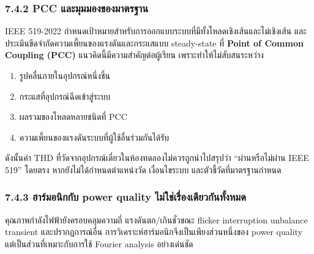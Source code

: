 \subsubsection{7.4.2 PCC และมุมมองของมาตรฐาน}

IEEE 519-2022 กำหนดเป้าหมายสำหรับการออกแบบระบบที่มีทั้งโหลดเชิงเส้นและไม่เชิงเส้น และประเมินขีดจำกัดความเพี้ยนของแรงดันและกระแสแบบ steady-state ที่ \textbf{Point of Common Coupling (PCC)} แนวคิดนี้มีความสำคัญต่อผู้เรียน เพราะทำให้ไม่สับสนระหว่าง

\begin{enumerate}
    \item รูปคลื่นภายในอุปกรณ์หนึ่งชิ้น
    \item กระแสที่อุปกรณ์ฉีดเข้าสู่ระบบ
    \item ผลรวมของโหลดหลายชนิดที่ PCC
    \item ความเพี้ยนของแรงดันระบบที่ผู้ใช้อื่นร่วมกันได้รับ
\end{enumerate}

ดังนั้นค่า THD ที่วัดจากอุปกรณ์เดี่ยวในห้องทดลองไม่ควรถูกนำไปสรุปว่า “ผ่านหรือไม่ผ่าน IEEE 519” โดยตรง หากยังไม่ได้กำหนดตำแหน่งวัด เงื่อนไขระบบ และตัวชี้วัดที่มาตรฐานกำหนด

\subsubsection{7.4.3 ฮาร์มอนิกกับ power quality ไม่ใช่เรื่องเดียวกันทั้งหมด}

คุณภาพกำลังไฟฟ้ายังครอบคลุมความถี่ แรงดันตก/เกินชั่วขณะ flicker interruption unbalance transient และปรากฏการณ์อื่น การวิเคราะห์ฮาร์มอนิกจึงเป็นเพียงส่วนหนึ่งของ power quality แต่เป็นส่วนที่เหมาะกับการใช้ Fourier analysis อย่างเด่นชัด



